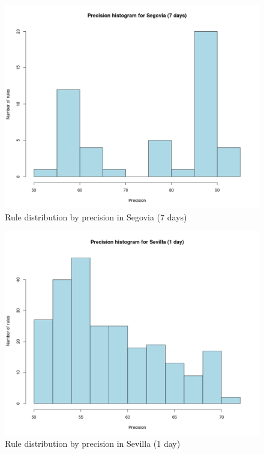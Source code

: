 \documentclass[a4paper,12pt]{article}
\begin{document}
\begin{figure}[hbtp]
\includegraphics[width=\textwidth]{img/hist_seg7.png}
\caption{Rule distribution by precision in Segovia (7 days)} \label{fig:hist_seg7}
\end{figure}

\begin{figure}[hbtp]
\includegraphics[width=\textwidth]{img/hist_sev1.png}
\caption{Rule distribution by precision in Sevilla (1 day)} \label{fig:hist_sev1}
\end{figure}
\end{document}
